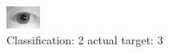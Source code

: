 \begin{figure}[h!]
\begin{center}
\includegraphics[width=0.60\columnwidth]{figures/ID1088_class_2_target_3.png}
\end{center}
\caption{ Classification: 2 actual target: 3}
\label{fig:ID1088_class_2_target_3}
\end{figure}
